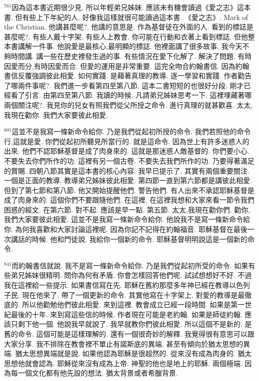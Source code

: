 \documentclass{book}
\begin{document}
$^{761}$因為這本書近期很少見.
所以年輕弟兄姊妹.
應該未有機會讀過《愛之志》這本書.
但有些上下年紀的人.
好像我這樣就很可能讀過這本書.
《愛之志》.
Mark of the Christian.
他講甚麼呢?.
他講的意思是.
作為基督徒在外面的人.
看到的標誌是甚麼呢?.
有些人戴十字架.
有些人上教會.
你可能在行動和衣著上看到標誌.
但他整本書講解一件事.
他說愛是最核心,最明顯的標誌.
他裡面講了很多故事.
我今天不夠時間講.
講一些在歷史裡發生過的事.
有些情況在愛下化解了.
解決了問題.
有時因愛而分,有時因愛而合.
但愛的運用是非常重要.
這完全吻合約翰書信.
因為約翰書信反覆強調彼此相愛.
如何實踐.
是藉著真理的教導.
逐一學習和實踐.
作者勸告了哪兩件事呢?.
我們進一步看第四至第八節.
這本二書短短的也很好分段.
剛才已經看了引言.
由第四至第八節.
我讀的時候.
凡請弟兄姊妹思考一下.
這裡埋藏著哪兩個關注呢?.
我見你的兒女有照我們從父所授之命令.
進行真理的就甚歡喜.
太太,我現在勸你.
我們大家要彼此相愛.

$^{801}$這並不是我寫一條新命令給你.
乃是我們從起初所授的命令.
我們若照他的命令行,這就是愛.
你們從起初所聽見所當行的.
就是這命令.
因為世上有許多迷惑人的出來.
他們不認耶穌基督是成了肉身來的.
這就是那迷惑人敵基督的.
你們要小心.
不要失去你們所作的功.
這裡有另一個古卷.
不要失去我們所作的功.
乃要得著滿足的賞賜.
四朝八節其實是這本書的核心內容.
我早已提示了.
其實有兩個重要關注.
一個是正面的教導.
教導弟兄姊妹彼此相愛.
第四節一直到第六節都是講彼此相愛.
但到了第七節和第八節.
他又開始提醒他們.
警告他們.
有人出來不承認耶穌基督是成了肉身來的.
這個你們不要跟隨他們.
在這裡.
在這裡我想和大家來看一節令我們困惑的經文.
在第六節.
對不起.
應該是早一點.
第五節.
太太,我現在勸你們.
勸你,我們大家要彼此相愛.
這並不是我寫一條新命令給你.
他說我不是寫一條新命令給你.
為何我喜歡和大家討論這裡呢.
因為你記不記得在約翰福音.
耶穌基督在最後一次講話的時候.
他和門徒說.
我給你一個新的命令.
耶穌基督明明說這是一個新的命令.

$^{841}$而約翰書信就說.
我不是寫一條新命令給你.
乃是我們從起初所受的命令.
如果有些弟兄姊妹很精明.
問你為何有矛盾.
你會怎樣回答他們呢.
試試想想好不好.
不過我在這裡給一些提示.
如果書信寫在先.
耶穌在舊約那麼多年神已經在教導以色列子民.
現在他來了.
帶了一個更新的命令.
其實他寫在十字架上.
對愛的教導是最徹底的.
所以他勸勉他們彼此相愛.
來到這裡.
教會成立已經一段時間.
如果是第一世紀最後的十年.
來到寫這些信的時候.
作者現在可能是老約翰.
如果是師徒約翰.
應該只剩下他一個.
他說我早就說了.
我早就教你們彼此相愛.
所以這個不是新的.
是舊的命令.
這個可能是這樣理解的.
還有一個很奇妙的解釋.
我覺得很有意思可以跟大家分享.
我不排除在教會裡不單止有諾斯底的異端.
甚至有傾向於猶太思想的異端.
猶太思想異端就是說.
如果他認為耶穌是很超然的.
從來沒有成為肉身的.
猶太思想他就會認為.
耶穌從來沒有成為上帝.
神聖的他也是地上的耶穌.
兩個極端.
因為每一個文化都有他先設的想法.
猶太背景或者希臘背景.
\end{document}
